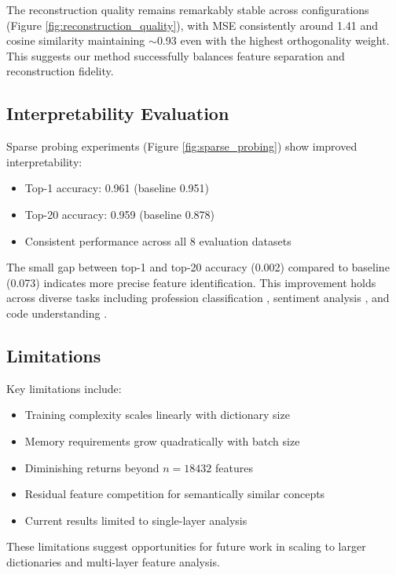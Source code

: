 \documentclass{article} %
\begin{document}
The reconstruction quality remains remarkably stable across configurations (Figure \ref{fig:reconstruction_quality}), with MSE consistently around 1.41 and cosine similarity maintaining $\sim$0.93 even with the highest orthogonality weight. This suggests our method successfully balances feature separation and reconstruction fidelity.

\subsection{Interpretability Evaluation}
Sparse probing experiments (Figure \ref{fig:sparse_probing}) show improved interpretability:
\begin{itemize}
    \item Top-1 accuracy: 0.961 (baseline 0.951)
    \item Top-20 accuracy: 0.959 (baseline 0.878)
    \item Consistent performance across all 8 evaluation datasets
\end{itemize}

The small gap between top-1 and top-20 accuracy (0.002) compared to baseline (0.073) indicates more precise feature identification. This improvement holds across diverse tasks including profession classification \cite{de-arteagaBiasBiosCase2019}, sentiment analysis \cite{hou2024bridging}, and code understanding \cite{gurneeFindingNeuronsHaystack2023}.

\subsection{Limitations}
Key limitations include:
\begin{itemize}
    \item Training complexity scales linearly with dictionary size
    \item Memory requirements grow quadratically with batch size
    \item Diminishing returns beyond $n=18432$ features
    \item Residual feature competition for semantically similar concepts
    \item Current results limited to single-layer analysis
\end{itemize}

These limitations suggest opportunities for future work in scaling to larger dictionaries and multi-layer feature analysis.
\end{document}
